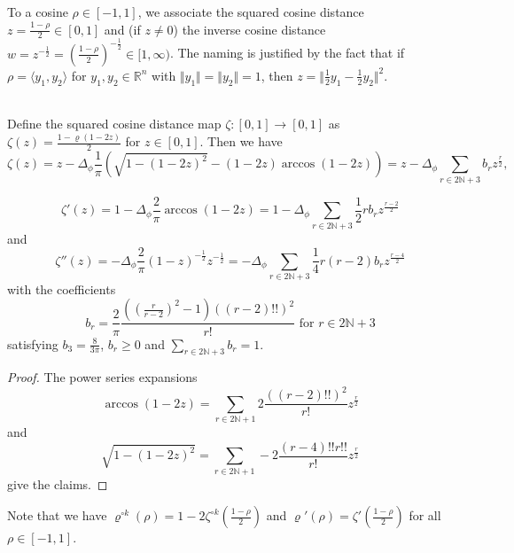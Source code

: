 \documentclass[twoside,11pt]{article}
\newcommand{\R}{\mathbb{R}}
\newcommand{\N}{\mathbb{N}}
\begin{document}
To a cosine $\rho \in [-1,1]$, we associate the squared cosine distance $z = \frac{1-\rho}{2} \in [0,1]$ and (if $z \neq 0$) the inverse cosine distance $w = z^{-\frac{1}{2}} = \left( \frac{1-\rho}{2} \right)^{-\frac{1}{2}} \in [1,\infty)$. The naming is justified by the fact that if $\rho = \langle y_1, y_2 \rangle$ for $y_1,y_2 \in \R^n$ with $\Vert y_1 \Vert = \Vert y_2 \Vert = 1$, then $z = \Vert \frac{1}{2} y_1 - \frac{1}{2} y_2 \Vert^2$.

\begin{proposition}\label{prop:squared_cosine_distance_map}~\\
Define the squared cosine distance map $\zeta : [0,1] \to [0,1]$ as $\zeta(z) = \frac{1-\varrho(1 - 2z)}{2}$ for $z \in [0,1]$. Then we have
\[
\zeta(z) 
= z - \Delta_\phi \frac{1}{\pi} \left( \sqrt{1-(1-2z)^2} - (1-2z)\arccos(1-2z) \right) 
= z - \Delta_\phi \sum_{r \in 2\N+3} b_r z^{\frac{r}{2}},
\]

\[
\zeta'(z) 
= 1 - \Delta_\phi \frac{2}{\pi} \arccos(1-2z) 
= 1 - \Delta_\phi \sum_{r \in 2\N+3} \frac{1}{2} r b_r z^{\frac{r-2}{2}}
\]
and
\[
\zeta''(z)
= - \Delta_\phi \frac{2}{\pi} (1-z)^{-\frac{1}{2}} z^{-\frac{1}{2}}
= - \Delta_\phi \sum_{r \in 2\N+3} \frac{1}{4} r (r-2) b_r z^{\frac{r-4}{2}}
\]
with the coefficients
\[
b_r = \frac{2}{\pi} \frac{((\frac{r}{r-2})^2-1)((r-2)!!)^2}{r!} \text{ for } r \in 2\N+3
\]
satisfying $b_3 = \frac{8}{3\pi}$, $b_r \geq 0$ and $\sum_{r \in 2\N+3} b_r = 1$.
\end{proposition}
\begin{proof}
The power series expansions 
\[
\arccos(1-2z)=\sum_{r \in 2\N+1} 2 \frac{((r-2)!!)^2}{r!} z^{\frac{r}{2}}
\]
and 
\[
\sqrt{1-(1-2z)^2}=\sum_{r \in 2\N+1} -2 \frac{(r-4)!! r!!}{r!} z^{\frac{r}{2}}
\]
give the claims.
\end{proof}
Note that we have $\varrho^{\circ k}(\rho) = 1 - 2 \zeta^{\circ k}(\frac{1-\rho}{2})$ and $\varrho'(\rho) = \zeta'(\frac{1-\rho}{2})$ for all $\rho \in [-1,1]$.
\end{document}
